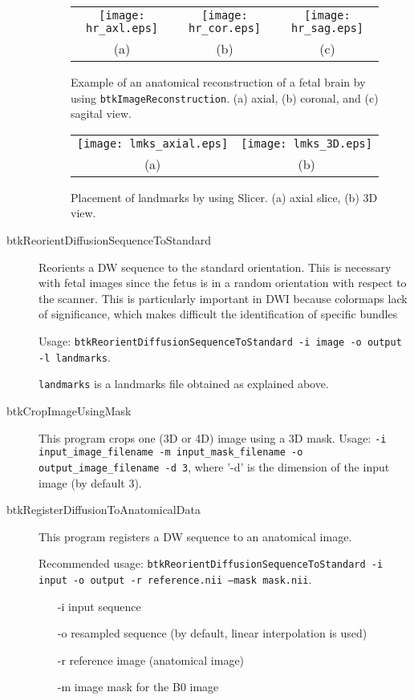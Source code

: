 \begin{description}
\begin{figure}[t]
\centering
\begin{tabular}{ccc}
\texttt{[image: hr\_axl.eps]}&
\texttt{[image: hr\_cor.eps]}&
\texttt{[image: hr\_sag.eps]}\\
{(a)}&{(b)}&{(c)}\\
\end{tabular}
\caption{Example of an anatomical reconstruction of a fetal brain by using
\texttt{btkImageReconstruction}. (a) axial, (b) coronal, and (c) sagital view.}
\label{fig:reconstruction}
\end{figure}

\begin{figure}[t]
\centering
\begin{tabular}{cc}
\texttt{[image: lmks\_axial.eps]}&
\texttt{[image: lmks\_3D.eps]}\\
{(a)}&{(b)}\\
\end{tabular}
\caption{Placement of landmarks by using Slicer. (a) axial slice, (b) 3D view.}
\label{fig:landmarks}
\end{figure}

  \item[btkReorientDiffusionSequenceToStandard] Reorients a DW sequence
to the standard orientation. This is necessary with fetal images since the fetus
is in a random orientation with respect to the scanner. This is particularly
important in DWI because colormaps lack of significance, which makes difficult
the identification of specific bundles 

Usage: \texttt{btkReorientDiffusionSequenceToStandard -i image -o output -l
landmarks}.

\texttt{landmarks} is a landmarks file obtained as explained above.

\item[btkCropImageUsingMask] This program crops one (3D or 4D) image using a 3D mask. Usage: \texttt{-i input\_image\_filename -m
input\_mask\_filename -o output\_image\_filename -d 3}, where '-d' is the dimension of the input image (by default 3).

\item[btkRegisterDiffusionToAnatomicalData] This program registers a DW
sequence to an anatomical image. 

Recommended usage: \texttt{btkReorientDiffusionSequenceToStandard -i input
-o output -r reference.nii --mask mask.nii}.
\begin{itemize}
\item[-i] input sequence
\item[-o] resampled sequence (by default, linear interpolation is used)
\item[-r] reference image (anatomical image)
\item[-m] image mask for the B0 image
\end{itemize}


\end{description}
